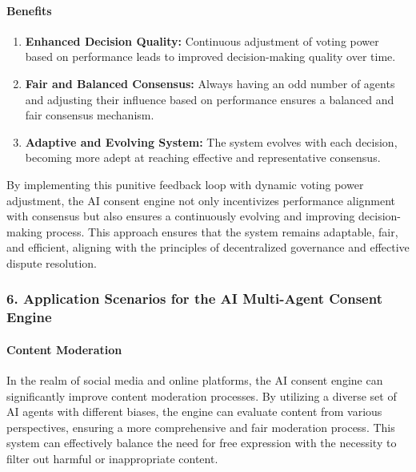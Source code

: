 \hypertarget{benefits}{%
\paragraph{Benefits}\label{benefits}}

\begin{enumerate}
\def\labelenumi{\arabic{enumi}.}
\item
  \textbf{Enhanced Decision Quality:} Continuous adjustment of voting
  power based on performance leads to improved decision-making quality
  over time.
\item
  \textbf{Fair and Balanced Consensus:} Always having an odd number of
  agents and adjusting their influence based on performance ensures a
  balanced and fair consensus mechanism.
\item
  \textbf{Adaptive and Evolving System:} The system evolves with each
  decision, becoming more adept at reaching effective and representative
  consensus.
\end{enumerate}

By implementing this punitive feedback loop with dynamic voting power
adjustment, the AI consent engine not only incentivizes performance
alignment with consensus but also ensures a continuously evolving and
improving decision-making process. This approach ensures that the system
remains adaptable, fair, and efficient, aligning with the principles of
decentralized governance and effective dispute resolution.

\hypertarget{application-scenarios-for-the-ai-multi-agent-consent-engine}{%
\subsubsection{6. Application Scenarios for the AI Multi-Agent Consent
Engine}\label{application-scenarios-for-the-ai-multi-agent-consent-engine}}

\hypertarget{content-moderation}{%
\paragraph{Content Moderation}\label{content-moderation}}

In the realm of social media and online platforms, the AI consent engine
can significantly improve content moderation processes. By utilizing a
diverse set of AI agents with different biases, the engine can evaluate
content from various perspectives, ensuring a more comprehensive and
fair moderation process. This system can effectively balance the need
for free expression with the necessity to filter out harmful or
inappropriate content.

